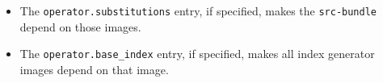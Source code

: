 \begin{frame}[fragile]
{\begin{itemize}
\begin{itemize}
                    \item
                        The \texttt{operator.substitutions} entry, if specified,
                        makes the \texttt{src-bundle} depend on those images.
                    \item
                        The \texttt{operator.base\_index} entry, if specified,
                        makes all index generator images depend on that image.
                \end{itemize}
        \end{itemize}
    }
\end{frame}
